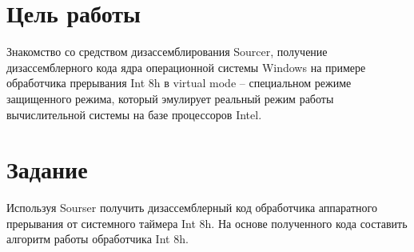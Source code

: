 \section*{Цель работы}

Знакомство со средством дизассемблирования Sourcer, получение 
дизассемблерного кода ядра операционной системы Windows на примере 
обработчика прерывания Int 8h в virtual mode – специальном режиме
защищенного режима, который эмулирует реальный режим работы вычислительной
системы на базе процессоров Intel.

\section*{Задание}

Используя Sourser получить дизассемблерный код обработчика аппаратного 
прерывания от системного таймера Int 8h. На основе полученного кода составить
алгоритм работы обработчика Int 8h.
